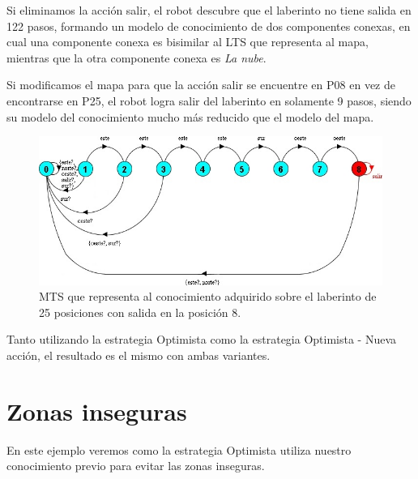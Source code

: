 Si eliminamos la acción salir, el robot descubre que el laberinto no tiene salida en 122 pasos, formando un modelo 
de conocimiento de dos componentes conexas, en cual una componente conexa es bisimilar al LTS que representa al mapa, 
mientras que la otra componente conexa es \textit{La nube}.

\vspace{\baselineskip}
Si modificamos el mapa para que la acción salir se encuentre en \textcolor[HTML]{0000A0}{P08} en vez de encontrarse 
en \textcolor[HTML]{0000A0}{P25}, el robot logra salir del laberinto en solamente 9 pasos, siendo su modelo del conocimiento 
mucho más reducido que el modelo del mapa.

\begin{figure}[H]
	\centering
		\includegraphics[width=1.0\textwidth]{Imagenes/Laberintos/25_knowledge_alternativo.jpg}
	\caption{MTS que representa al conocimiento adquirido sobre el laberinto de 25 posiciones con salida en la posición 8.}
	\label{fig:25_knowledge_alternativo}
\end{figure}

Tanto utilizando la estrategia Optimista como la estrategia Optimista - Nueva acción, el resultado es el mismo con ambas variantes.

\clearpage

\section{Zonas inseguras}

En este ejemplo veremos como la estrategia Optimista utiliza nuestro conocimiento previo para evitar las zonas inseguras.


